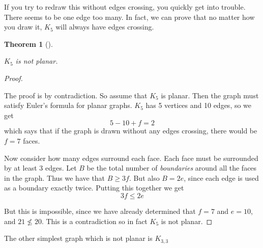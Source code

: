 \documentclass[10pt,]{book}
\theoremstyle{plain}
\newtheorem{theorem}{Theorem}[section]
\theoremstyle{definition}
\theoremstyle{definition}
\theoremstyle{definition}
\numberwithin{equation}{chapter}
\newcommand{\vtx}[2]{node[fill,circle,inner sep=0pt, minimum size=4pt,label=#1:#2]{}}
\renewcommand{\v}{\vtx{above}{}}
\begin{document}
If you try to redraw this without edges crossing, you quickly get into trouble. There seems to be one edge too many. In fact, we can prove that no matter how you draw it, \(K_5\) will always have edges crossing.
%
\begin{theorem}[]\label{theorem-2}

\(K_5\) is not planar.
%
\end{theorem}
\begin{proof}\hypertarget{proof-55}{}

The proof is by contradiction. So assume that \(K_5\) is planar. Then the graph must satisfy Euler's formula for planar graphs. \(K_5\) has 5 vertices and 10 edges, so we get
\begin{equation*}
  5 - 10 + f = 2
\end{equation*}
which says that if the graph is drawn without any edges crossing, there would be \(f = 7\) faces.
%
\par

Now consider how many edges surround each face. Each face must be surrounded by at least 3 edges. Let \(B\) be the total number of \emph{boundaries} around all the faces in the graph. Thus we have that \(B \ge 3f\). But also \(B = 2e\), since each edge is used as a boundary exactly twice. Putting this together we get
\begin{equation*}
  3f \le 2e
\end{equation*}
%
\par

But this is impossible, since we have already determined that \(f = 7\) and \(e = 10\), and \(21 \not\le 20\). This is a contradiction so in fact \(K_5\) is not planar.
%
\end{proof}
\par

The other simplest graph which is not planar is \(K_{3,3}\)
%
\leavevmode%
\begin{figure}
\centering
{
}
\end{figure}
\par
\end{document}
